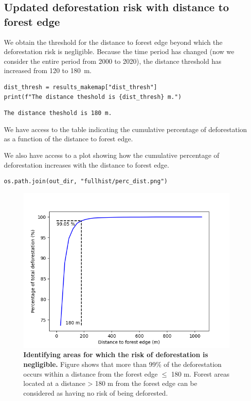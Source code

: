\documentclass[paper=a4, 12pt, DIV=12]{scrartcl}
\begin{document}
\subsection{Updated deforestation risk with distance to forest edge}
\label{sec:org8863b95}

We obtain the threshold for the distance to forest edge beyond which the deforestation risk is negligible. Because the time period has changed (now we consider the entire period from 2000 to 2020), the distance threshold has increased from 120 to 180 m.

\begin{verbatim}
dist_thresh = results_makemap["dist_thresh"]
print(f"The distance theshold is {dist_thresh} m.")
\end{verbatim}

\begin{verbatim}
The distance theshold is 180 m.
\end{verbatim}


We have access to the table indicating the cumulative percentage of deforestation as a function of the distance to forest edge.

We also have access to a plot showing how the cumulative percentage of deforestation increases with the distance to forest edge.

\begin{verbatim}
os.path.join(out_dir, "fullhist/perc_dist.png")
\end{verbatim}

\begin{figure}[H]
\centering
\includegraphics[width=0.8\linewidth]{outputs/fullhist/perc_dist.png}
\caption{\label{fig:org3fa102b}\textbf{Identifying areas for which the risk of deforestation is negligible.} Figure shows that more than 99\% of the deforestation occurs within a distance from the forest edge \(\leq\) 180 m. Forest areas located at a distance > 180 m from the forest edge can be considered as having no risk of being deforested.}
\end{figure}
\end{document}
